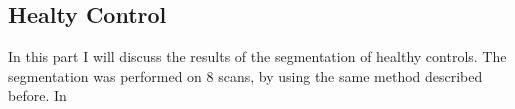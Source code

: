 
	\subsection{Healty Control}
	
	In this part I will discuss the results of the segmentation of healthy controls. The segmentation was performed on $8$ scans, by using the same method described before.  In  
